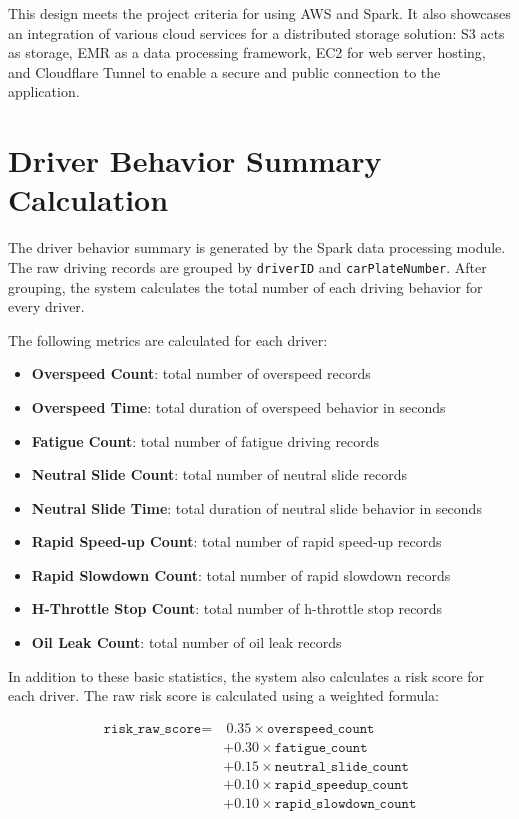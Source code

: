 \documentclass[12pt,a4paper]{article}
\begin{document}
This design meets the project criteria for using AWS and Spark. It also showcases an integration of various cloud services for a distributed storage solution: S3 acts as storage, EMR as a data processing framework, EC2 for web server hosting, and Cloudflare Tunnel to enable a secure and public connection to the application.

\section{Driver Behavior Summary Calculation}

The driver behavior summary is generated by the Spark data processing module. The raw driving records are grouped by \texttt{driverID} and \texttt{carPlateNumber}. After grouping, the system calculates the total number of each driving behavior for every driver.

The following metrics are calculated for each driver:

\begin{itemize}
    \item \textbf{Overspeed Count}: total number of overspeed records
    \item \textbf{Overspeed Time}: total duration of overspeed behavior in seconds
    \item \textbf{Fatigue Count}: total number of fatigue driving records
    \item \textbf{Neutral Slide Count}: total number of neutral slide records
    \item \textbf{Neutral Slide Time}: total duration of neutral slide behavior in seconds
    \item \textbf{Rapid Speed-up Count}: total number of rapid speed-up records
    \item \textbf{Rapid Slowdown Count}: total number of rapid slowdown records
    \item \textbf{H-Throttle Stop Count}: total number of h-throttle stop records
    \item \textbf{Oil Leak Count}: total number of oil leak records
\end{itemize}

In addition to these basic statistics, the system also calculates a risk score for each driver. The raw risk score is calculated using a weighted formula:

\[
\begin{aligned}
\texttt{risk\_raw\_score} =
&\ 0.35 \times \texttt{overspeed\_count} \\
&+ 0.30 \times \texttt{fatigue\_count} \\
&+ 0.15 \times \texttt{neutral\_slide\_count} \\
&+ 0.10 \times \texttt{rapid\_speedup\_count} \\
&+ 0.10 \times \texttt{rapid\_slowdown\_count}
\end{aligned}
\]
\end{document}
